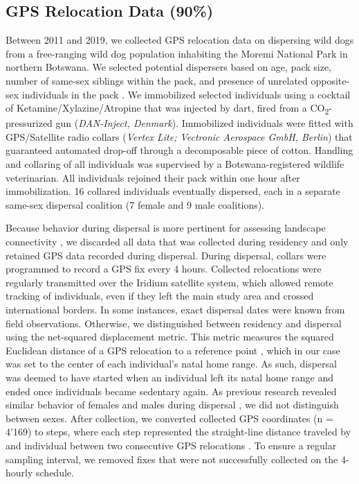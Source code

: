 \documentclass[abstract=on,10pt,a4paper,bibliography=totocnumbered]{article}
\begin{document}
\subsection{GPS Relocation Data (90\%)}
Between 2011 and 2019, we collected GPS relocation data on dispersing wild dogs
from a free-ranging wild dog population inhabiting the Moremi National Park in
northern Botswana. We selected potential dispersers based on age, pack size,
number of same‐sex siblings within the pack, and presence of unrelated
opposite-sex individuals in the pack \citep{McNutt.1996, Behr.2020}. We
immobilized selected individuals using a cocktail of Ketamine/Xylazine/Atropine
\citep{Osofsky.1996, Cozzi.2020} that was injected by dart, fired from a
CO\textsubscript{2}-pressurized gun (\textit{DAN-Inject, Denmark}). Immobilized
individuals were fitted with GPS/Satellite radio collars (\textit{Vertex Lite;
Vectronic Aerospace GmbH, Berlin}) that guaranteed automated drop-off through a
decomposable piece of cotton. Handling and collaring of all individuals was
supervised by a Botswana-registered wildlife veterinarian. All individuals
rejoined their pack within one hour after immobilization. 16 collared
individuals eventually dispersed, each in a separate same-sex dispersal
coalition (7 female and 9 male coalitions).

Because behavior during dispersal is more pertinent for assessing landscape
connectivity \citep{Elliot.2014, Abrahms.2017}, we discarded all data that was
collected during residency and only retained GPS data recorded during dispersal.
During dispersal, collars were programmed to record a GPS fix every 4 hours.
Collected relocations were regularly transmitted over the Iridium satellite
system, which allowed remote tracking of individuals, even if they left the main
study area and crossed international borders. In some instances, exact dispersal
dates were known from field observations. Otherwise, we distinguished between
residency and dispersal using the net-squared displacement metric. This metric
measures the squared Euclidean distance of a GPS relocation to a reference point
\citep{Borger.2012}, which in our case was set to the center of each
individual's natal home range. As such, dispersal was deemed to have started
when an individual left its natal home range and ended once individuals became
sedentary again. As previous research revealed similar behavior of females and
males during dispersal \citep{Woodroffe.2019, Cozzi.2020}, we did not
distinguish between sexes. After collection, we converted collected GPS
coordinates (n = 4'169) to steps, where each step represented the straight-line
distance traveled by and individual between two consecutive GPS relocations
\citep{Turchin.1998}. To ensure a regular sampling interval, we removed fixes
that were not successfully collected on the 4-hourly schedule.
\end{document}
